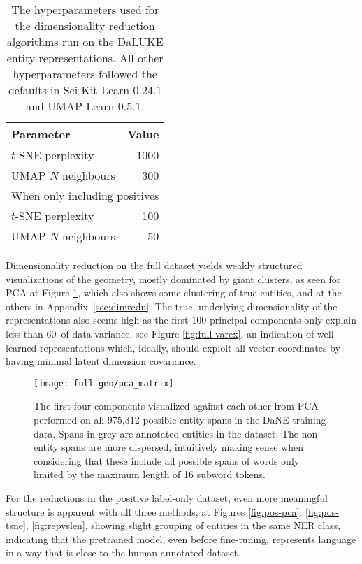 \documentclass[main.tex]{subfiles}
\begin{document}
\begin{table}[H]
    \centering
    \begin{tabular}{l|r}
        Parameter           &  Value\\\hline
        $t$-SNE perplexity  &  1000   \\
        UMAP $N$ neighbours &  300\\\hline
        \multicolumn{2}{c}{When only including positives}\\\hline
        $t$-SNE perplexity  & 100\\
        UMAP $N$ neighbours & 50
    \end{tabular}
    \caption{
        The hyperparameters used for the dimensionality reduction algorithms run on the DaLUKE entity representations.
        All other hyperparameters followed the defaults in Sci-Kit Learn 0.24.1 and UMAP Learn 0.5.1.
    }\label{tab:dimreducer-hyper}
\end{table}\noindent
Dimensionality reduction on the full dataset yields weakly structured visualizations of the geometry, mostly dominated by giant clusters, as seen for PCA at Figure \ref{fig:all-pca}, which also shows some clustering of true entities, and at the others in Appendix~\ref{sec:dimredu}.
The true, underlying dimensionality of the representations also seems high as the first 100 principal components only explain less than 60\pro\ of data variance, see Figure \ref{fig:full-varex}, an indication of well-learned representations which, ideally, should exploit all vector coordinates by having minimal latent dimension covariance.

\begin{figure}[H]
    \centering
        \texttt{[image: full-geo/pca\_matrix]}
    \caption{
        The first four components visualized against each other from PCA performed on all 975,312 possible entity spans in the DaNE training data.
        Spans in grey are annotated entities in the dataset.
        The non-entity spans are more dispersed, intuitively making sense when considering that these include all possible spans of words only limited by the maximum length of 16 subword tokens.
    }
    \label{fig:all-pca}
\end{figure}\noindent
For the reductions in the positive label-only dataset, even more meaningful structure is apparent with all three methods, at Figures \ref{fig:pos-pca}, \ref{fig:pos-tsne}, \ref{fig:repvslen}, showing slight grouping of entities in the same NER class, indicating that the pretrained model, even before fine-tuning, represents language in a way that is close to the human annotated dataset.
\end{document}

